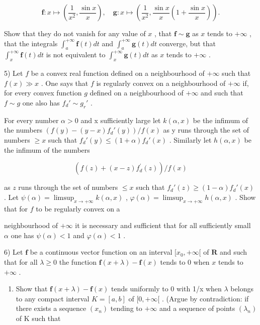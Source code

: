 \[
\mathbf {f}: x \mapsto \left(\frac {1}{x ^ {2}}, \frac {\sin x}{x}\right), \quad \mathbf {g}: x \mapsto \left(\frac {1}{x ^ {2}}, \frac {\sin x}{x} \left(1 + \frac {\sin x}{x}\right)\right).
\]

Show that they do not vanish for any value of \(x\) , that \(\mathbf{f} \sim \mathbf{g}\) as \(x\) tends to \(+\infty\) , that the integrals \(\int_{a}^{+\infty} \mathbf{f}(t) dt\) and \(\int_{a}^{+\infty} \mathbf{g}(t) dt\) converge, but that \(\int_{x}^{+\infty} \mathbf{f}(t) dt\) is not equivalent to \(\int_{x}^{+\infty} \mathbf{g}(t) dt\) as \(x\) tends to \(+\infty\) .

5) Let \(f\) be a convex real function defined on a neighbourhood of \(+\infty\) such that \(f(x) \gg x\) . One says that \(f\) is regularly convex on a neighbourhood of \(+\infty\) if, for every convex function \(g\) defined on a neighbourhood of \(+\infty\) and such that \(f \sim g\) one also has \(f_d' \sim g_r'\) .

For every number \(\alpha > 0\) and x sufficiently large let \(k(\alpha, x)\) be the infimum of the numbers \(\left(f(y) - (y - x)f_{d}'(y)\right)/f(x)\) as y runs through the set of numbers \(\geqslant x\) such that \(f_{d}'(y) \leqslant (1 + \alpha)f_{d}'(x)\) . Similarly let \(h(\alpha, x)\) be the infimum of the numbers

\[
\left(f (z) + (x - z) f _ {d} ^ {\prime} (z)\right) / f (x)
\]

as \(z\) runs through the set of numbers \(\leqslant x\) such that \(f_d'(z) \geqslant (1 - \alpha)f_d'(x)\) . Let \(\psi(\alpha) = \limsup_{x \to +\infty} k(\alpha, x)\) , \(\varphi(\alpha) = \limsup_{x \to +\infty} h(\alpha, x)\) . Show that for \(f\) to be regularly convex on a

neighbourhood of \(+\infty\) it is necessary and sufficient that for all sufficiently small \(\alpha\) one has \(\psi(\alpha) < 1\) and \(\varphi(\alpha) < 1\) .

6) Let \(\mathbf{f}\) be a continuous vector function on an interval \([x_0, +\infty[\) of \(\mathbf{R}\) and such that for all \(\lambda \geqslant 0\) the function \(\mathbf{f}(x + \lambda) - \mathbf{f}(x)\) tends to 0 when \(x\) tends to \(+\infty\) .

\begin{enumerate}
\def\labelenumi{\alph{enumi})}
\tightlist
\item
  Show that \(\mathbf{f}(x+\lambda)-\mathbf{f}(x)\) tends uniformly to 0 with 1/x when \(\lambda\) belongs to any compact interval \(K=[a,b]\) of \([0,+\infty[\) . (Argue by contradiction: if there exists a sequence \((x_{n})\) tending to \(+\infty\) and a sequence of points \((\lambda_{n})\) of K such that
\end{enumerate}


